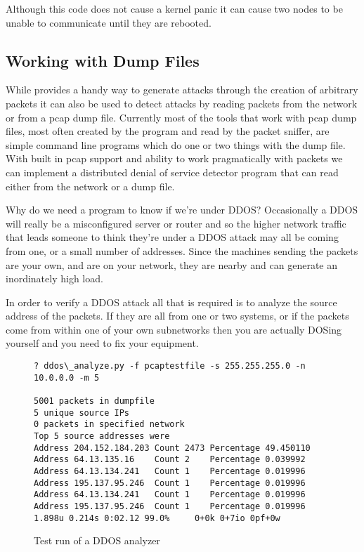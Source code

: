 \documentclass[11pt]{article}
\begin{document}
Although this code does not cause a kernel panic it can cause two
nodes to be unable to communicate until they are rebooted.

\subsection{Working with Dump Files}
\label{sec:working-with-dumpfiles}

While  provides a handy way to generate attacks through
the creation of arbitrary packets it can also be used to detect
attacks by reading packets from the network or from a pcap dump file.
Currently most of the tools that work with pcap dump files, most often
created by the  program and read by the
 packet sniffer, are simple command line programs
which do one or two things with the dump file.  With 
built in pcap support and ability to work pragmatically with
packets we can implement a distributed denial of service detector
program that can read either from the network or a dump file.

Why do we need a program to know if we're under DDOS?  Occasionally
a DDOS will really be a misconfigured server or router and so the
higher network traffic that leads someone to think they're under a
DDOS attack may all be coming from one, or a small number of
addresses.  Since the machines sending the packets are your own, and
are on your network, they are nearby and can generate an inordinately
high load.

In order to verify a DDOS attack all that is required is to analyze
the source address of the packets.  If they are all from one or two
systems, or if the packets come from within one of your own
subnetworks then you are actually DOSing yourself and you need to
fix your equipment.

\begin{figure}
  \centering
\begin{verbatim}
? ddos\_analyze.py -f pcaptestfile -s 255.255.255.0 -n 10.0.0.0 -m 5

5001 packets in dumpfile
5 unique source IPs
0 packets in specified network
Top 5 source addresses were
Address 204.152.184.203 Count 2473 Percentage 49.450110
Address 64.13.135.16    Count 2    Percentage 0.039992
Address 64.13.134.241   Count 1    Percentage 0.019996
Address 195.137.95.246  Count 1    Percentage 0.019996
Address 64.13.134.241   Count 1    Percentage 0.019996
Address 195.137.95.246  Count 1    Percentage 0.019996
1.898u 0.214s 0:02.12 99.0%     0+0k 0+7io 0pf+0w
\end{verbatim}
  \caption{Test run of a DDOS analyzer}
  \label{fig:test-run-of-ddos-analyzer}
\end{figure}
\end{document}
